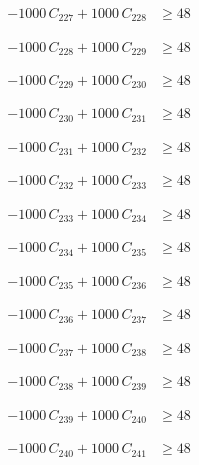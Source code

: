 \documentclass[a4paper,11pt]{article}
\begin{document}
\begin{align}
-1000\,C_{227} + 1000\,C_{228} &\geq 48 \nonumber
\end{align}

\begin{align}
-1000\,C_{228} + 1000\,C_{229} &\geq 48 \nonumber
\end{align}

\begin{align}
-1000\,C_{229} + 1000\,C_{230} &\geq 48 \nonumber
\end{align}

\begin{align}
-1000\,C_{230} + 1000\,C_{231} &\geq 48 \nonumber
\end{align}

\begin{align}
-1000\,C_{231} + 1000\,C_{232} &\geq 48 \nonumber
\end{align}

\begin{align}
-1000\,C_{232} + 1000\,C_{233} &\geq 48 \nonumber
\end{align}

\begin{align}
-1000\,C_{233} + 1000\,C_{234} &\geq 48 \nonumber
\end{align}

\begin{align}
-1000\,C_{234} + 1000\,C_{235} &\geq 48 \nonumber
\end{align}

\begin{align}
-1000\,C_{235} + 1000\,C_{236} &\geq 48 \nonumber
\end{align}

\begin{align}
-1000\,C_{236} + 1000\,C_{237} &\geq 48 \nonumber
\end{align}

\begin{align}
-1000\,C_{237} + 1000\,C_{238} &\geq 48 \nonumber
\end{align}

\begin{align}
-1000\,C_{238} + 1000\,C_{239} &\geq 48 \nonumber
\end{align}

\begin{align}
-1000\,C_{239} + 1000\,C_{240} &\geq 48 \nonumber
\end{align}

\begin{align}
-1000\,C_{240} + 1000\,C_{241} &\geq 48 \nonumber
\end{align}
\end{document}

